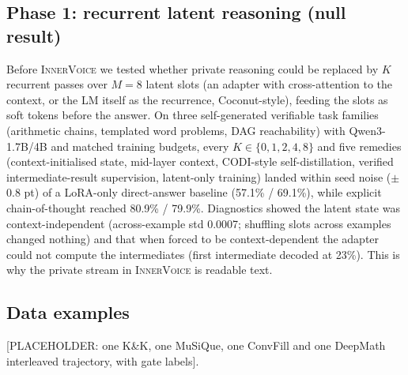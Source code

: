 \documentclass[letterpaper]{article} %
\newcommand{\placeholder}[1]{{\color{red}[PLACEHOLDER: #1]}}
\newcommand{\iv}{\textsc{InnerVoice}}
\begin{document}
\subsection{Phase 1: recurrent latent reasoning (null result)}\label{app:latent}
Before \iv{} we tested whether private reasoning could be replaced by $K$ recurrent passes over $M{=}8$ latent slots (an adapter with cross-attention to the context, or the LM itself as the recurrence, Coconut-style), feeding the slots as soft tokens before the answer. On three self-generated verifiable task families (arithmetic chains, templated word problems, DAG reachability) with Qwen3-1.7B/4B and matched training budgets, every $K\in\{0,1,2,4,8\}$ and five remedies (context-initialised state, mid-layer context, CODI-style self-distillation, verified intermediate-result supervision, latent-only training) landed within seed noise ($\pm$0.8 pt) of a LoRA-only direct-answer baseline (57.1\% / 69.1\%), while explicit chain-of-thought reached 80.9\% / 79.9\%. Diagnostics showed the latent state was context-independent (across-example std 0.0007; shuffling slots across examples changed nothing) and that when forced to be context-dependent the adapter could not compute the intermediates (first intermediate decoded at 23\%). This is why the private stream in \iv{} is readable text.

\subsection{Data examples}\label{app:data}
\placeholder{one K\&K, one MuSiQue, one ConvFill and one DeepMath interleaved trajectory, with gate labels}.


\end{document}
